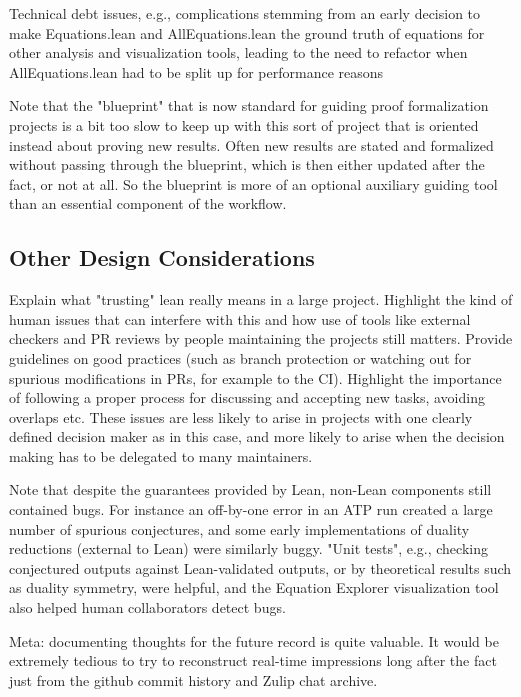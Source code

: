 Technical debt issues, e.g., complications stemming from an early decision to make Equations.lean and AllEquations.lean the ground truth of equations for other analysis and visualization tools, leading to the need to refactor when AllEquations.lean had to be split up for performance reasons

Note that the "blueprint" that is now standard for guiding proof formalization projects is a bit too slow to keep up with this sort of project that is oriented instead about proving new results. Often new results are stated and formalized without passing through the blueprint, which is then either updated after the fact, or not at all. So the blueprint is more of an optional auxiliary guiding tool than an essential component of the workflow.

\subsection{Other Design Considerations}

Explain what "trusting" lean really means in a large project. Highlight the kind of human issues that can interfere with this and how use of tools like external checkers and PR reviews by people maintaining the projects still matters. Provide guidelines on good practices (such as branch protection or watching out for spurious modifications in PRs, for example to the CI). Highlight the importance of following a proper process for discussing and accepting new tasks, avoiding overlaps etc. These issues are less likely to arise in projects with one clearly defined decision maker as in this case, and more likely to arise when the decision making has to be delegated to many maintainers.

Note that despite the guarantees provided by Lean, non-Lean components still contained bugs. For instance an off-by-one error in an ATP run created a large number of spurious conjectures, and some early implementations of duality reductions (external to Lean) were similarly buggy. "Unit tests", e.g., checking conjectured outputs against Lean-validated outputs, or by theoretical results such as duality symmetry, were helpful, and the Equation Explorer visualization tool also helped human collaborators detect bugs.

Meta: documenting thoughts for the future record is quite valuable. It would be extremely tedious to try to reconstruct real-time impressions long after the fact just from the github commit history and Zulip chat archive.

